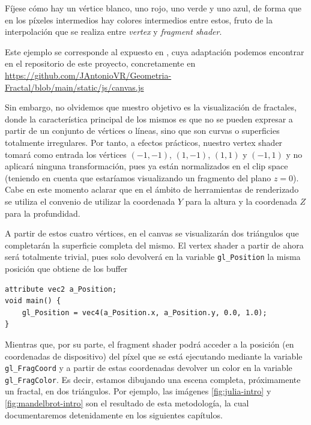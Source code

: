 Fíjese cómo hay un vértice blanco, uno rojo, uno verde y uno azul, de forma que en los píxeles intermedios hay colores intermedios entre estos, fruto de la interpolación que se realiza entre \textit{vertex} y \textit{fragment shader}.

Este ejemplo se corresponde al expuesto en \cite{MDN-1}, cuya adaptación podemos encontrar en el repositorio de este proyecto, concretamente en \url{https://github.com/JAntonioVR/Geometria-Fractal/blob/main/static/js/canvas.js} %

Sin embargo, no olvidemos que nuestro objetivo es la visualización de fractales, donde la característica principal de los mismos es que no se pueden expresar a partir de un conjunto de vértices o líneas, sino que son curvas o superficies totalmente irregulares. Por tanto, a efectos prácticos, nuestro vertex shader tomará como entrada los vértices $(-1,-1)$, $(1,-1)$, $(1,1)$ y $(-1,1)$ y no aplicará ninguna transformación, pues ya están normalizados en el clip space (teniendo en cuenta que estaríamos visualizando un fragmento del plano $z=0$). Cabe en este momento aclarar que en el ámbito de herramientas de renderizado se utiliza el convenio de utilizar la coordenada $Y$ para la altura y la coordenada $Z$ para la profundidad. 

A partir de estos cuatro vértices, en el canvas se visualizarán dos triángulos que completarán la superficie completa del mismo. El vertex shader a partir de ahora será totalmente trivial, pues solo devolverá en la variable \verb|gl_Position| la misma posición que obtiene de los buffer

\begin{lstlisting}
attribute vec2 a_Position;
void main() {
    gl_Position = vec4(a_Position.x, a_Position.y, 0.0, 1.0);
}
\end{lstlisting}

Mientras que, por su parte, el fragment shader podrá acceder a la posición (en coordenadas de dispositivo) del píxel que se está ejecutando mediante la variable \verb|gl_FragCoord| y a partir de estas coordenadas devolver un color en la variable \verb|gl_FragColor|. Es decir, estamos dibujando una escena completa, próximamente un fractal, en dos triángulos. Por ejemplo, las imágenes \ref{fig:julia-intro} y \ref{fig:mandelbrot-intro} son el resultado de esta metodología, la cual documentaremos detenidamente en los siguientes capítulos.
